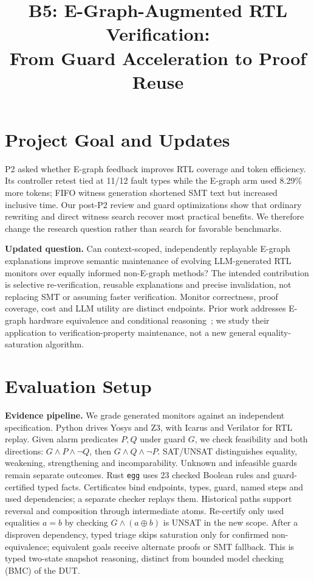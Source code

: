 \documentclass[conference,10pt,letterpaper]{IEEEtran}
\title{B5: E-Graph-Augmented RTL Verification:\\
From Guard Acceleration to Proof Reuse}
\author{\IEEEauthorblockN{Chiyu Chen (cc5583), Mingyuan Zheng (mz3143), Yiwen Chen (yc4653)}
\IEEEauthorblockA{COMS 6998: AI-Native Computing $\mid$ Fall 2026\\
P3: Evaluation Plan \& Initial Results $\mid$ Due November 25, 2026, 11:59 PM ET}}
\begin{document}
\maketitle
\thispagestyle{plain}
\pagestyle{plain}

\section{Project Goal and Updates}
P2 asked whether E-graph feedback improves RTL coverage and token efficiency. Its controller retest tied at 11/12 fault types while the E-graph arm used 8.29\% more tokens; FIFO witness generation shortened SMT text but increased inclusive time. Our post-P2 review and guard optimizations show that ordinary rewriting and direct witness search recover most practical benefits. We therefore change the research question rather than search for favorable benchmarks.

\textbf{Updated question.} Can context-scoped, independently replayable E-graph explanations improve semantic maintenance of evolving LLM-generated RTL monitors over equally informed non-E-graph methods? The intended contribution is selective re-verification, reusable explanations and precise invalidation, not replacing SMT or assuming faster verification. Monitor correctness, proof coverage, cost and LLM utility are distinct endpoints. Prior work addresses E-graph hardware equivalence and conditional reasoning~\cite{wordlevel,colored}; we study their application to verification-property maintenance, not a new general equality-saturation algorithm.

\section{Evaluation Setup}
\textbf{Evidence pipeline.} We grade generated monitors against an independent specification. Python drives Yosys and Z3, with Icarus and Verilator for RTL replay. Given alarm predicates $P,Q$ under guard $G$, we check feasibility and both directions: $G\land P\land\neg Q$, then $G\land Q\land\neg P$. SAT/UNSAT distinguishes equality, weakening, strengthening and incomparability. Unknown and infeasible guards remain separate outcomes. Rust \texttt{egg} uses 23 checked Boolean rules and guard-certified typed facts. Certificates bind endpoints, types, guard, named steps and used dependencies; a separate checker replays them. Historical paths support reversal and composition through intermediate atoms. Re-certify only used equalities $a=b$ by checking $G\land(a\oplus b)$ is UNSAT in the new scope. After a disproven dependency, typed triage skips saturation only for confirmed non-equivalence; equivalent goals receive alternate proofs or SMT fallback. This is typed two-state snapshot reasoning, distinct from bounded model checking (BMC) of the DUT.
\end{document}
